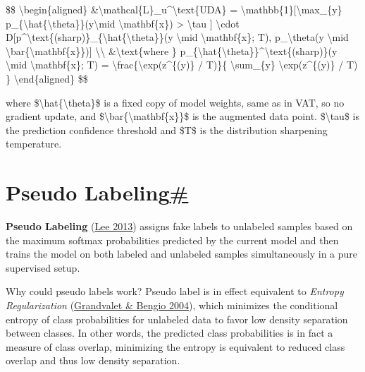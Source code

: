\$\$ \textbackslash begin\{aligned\} \&\textbackslash mathcal\{L\}\_u\^{}\textbackslash text\{UDA\} = \textbackslash mathbb\{1\}{[}\textbackslash max\_\{y\textquotesingle\} p\_\{\textbackslash hat\{\textbackslash theta\}\}(y\textquotesingle\textbackslash mid \textbackslash mathbf\{x\}) \textgreater{} \textbackslash tau {]} \textbackslash cdot D{[}p\^{}\textbackslash text\{(sharp)\}\_\{\textbackslash hat\{\textbackslash theta\}\}(y \textbackslash mid \textbackslash mathbf\{x\}; T), p\_\textbackslash theta(y \textbackslash mid \textbackslash bar\{\textbackslash mathbf\{x\}\}){]} \textbackslash\textbackslash{} \&\textbackslash text\{where \} p\_\{\textbackslash hat\{\textbackslash theta\}\}\^{}\textbackslash text\{(sharp)\}(y \textbackslash mid \textbackslash mathbf\{x\}; T) = \textbackslash frac\{\textbackslash exp(z\^{}\{(y)\} / T)\}\{ \textbackslash sum\_\{y\textquotesingle\} \textbackslash exp(z\^{}\{(y\textquotesingle)\} / T) \} \textbackslash end\{aligned\} \$\$

where \$\textbackslash hat\{\textbackslash theta\}\$ is a fixed copy of model weights, same as in VAT, so no gradient update, and \$\textbackslash bar\{\textbackslash mathbf\{x\}\}\$ is the augmented data point. \$\textbackslash tau\$ is the prediction confidence threshold and \$T\$ is the distribution sharpening temperature.

\section{\texorpdfstring{Pseudo Labeling\hyperref[pseudo-labeling]{\#}}{Pseudo Labeling\#}}\label{pseudo-labeling}

\textbf{Pseudo Labeling} (\href{http://citeseerx.ist.psu.edu/viewdoc/download?doi=10.1.1.664.3543&rep=rep1&type=pdf}{Lee 2013}) assigns fake labels to unlabeled samples based on the maximum softmax probabilities predicted by the current model and then trains the model on both labeled and unlabeled samples simultaneously in a pure supervised setup.

Why could pseudo labels work? Pseudo label is in effect equivalent to \emph{Entropy Regularization} (\href{https://papers.nips.cc/paper/2004/hash/96f2b50b5d3613adf9c27049b2a888c7-Abstract.html}{Grandvalet \& Bengio 2004}), which minimizes the conditional entropy of class probabilities for unlabeled data to favor low density separation between classes. In other words, the predicted class probabilities is in fact a measure of class overlap, minimizing the entropy is equivalent to reduced class overlap and thus low density separation.

